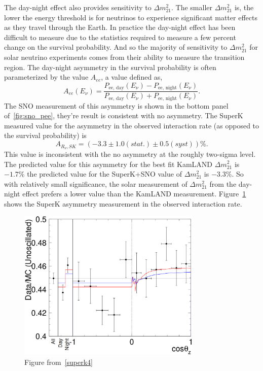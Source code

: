 The day-night effect also provides sensitivity to $\Delta m^{2}_{21}$.
The smaller $\Delta m^{2}_{21}$ is, the lower the energy threshold is for
neutrinos to experience significant matter effects as they travel through the
Earth.
In practice the day-night effect has been difficult to measure due to
the statistics required to measure a few percent change on the survival
probability.
And so the majority of sensitivity to $\Delta m^{2}_{21}$ for solar neutrino
experiments comes from their ability to measure the transition region.
The day-night asymmetry in the survival probability is often parameterized by the value $A_{ee}$, a value
defined as,
\begin{equation}
    A_{ee}(E_\nu) = \frac{P_{\text{ee, day}}(E_\nu) - P_{\text{ee, night}}(E_\nu)}{P_{\text{ee, day}}(E_\nu) + P_{\text{ee, night}}(E_\nu)}\text{.}
\end{equation}
The SNO measurement of this asymmetry is shown in the bottom panel of~\ref{fig:sno_pee},
they're result is consistent with no asymmetry.
The SuperK measured value for the asymmetry in the observed interaction rate (as opposed to
the survival probability) is
\begin{equation*}
    A_{R_\nu, SK} = (-3.3 \pm 1.0(stat.)\pm 0.5(syst))\%\text{.} 
\end{equation*}
This value is inconsistent with the no asymmetry at the roughly two-sigma level.
The predicted value for this asymmetry for the best fit KamLAND $\Delta m^{2}_{21}$
is $-1.7\%$ the predicted value for the SuperK+SNO value of $\Delta m^{2}_{21}$ is
$-3.3\%$.
So with relatively small significance, the solar measurement of $\Delta m^{2}_{21}$ from the day-night effect
prefers a lower value than the KamLAND measurement.
Figure~\ref{fig:sk_daynight} shows the SuperK asymmetry measurement in the
observed interaction rate.

\begin{figure}[htbp]
    \centering
    \includegraphics[width=0.78\textwidth]{sk_daynight}
    \caption[]{Figure from~\ref{superk4}}
    \label{fig:sk_daynight}
\end{figure}


